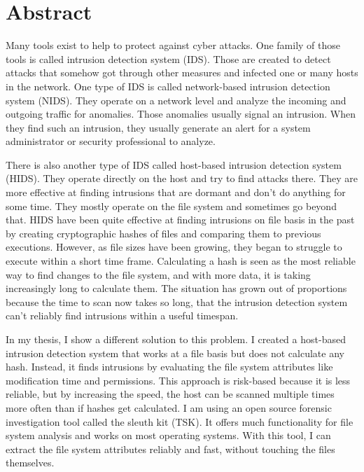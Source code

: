 \chapter*{Abstract}
\label{chap:abstract}

Many tools exist to help to protect against cyber attacks. One family of those tools is called intrusion detection system (IDS). Those are created to detect attacks that somehow got through other measures and infected one or many hosts in the network. One type of IDS is called network-based intrusion detection system (NIDS). They operate on a network level and analyze the incoming and outgoing traffic for anomalies. Those anomalies usually signal an intrusion. When they find such an intrusion, they usually generate an alert for a system administrator or security professional to analyze.

There is also another type of IDS called host-based intrusion detection system (HIDS). They operate directly on the host and try to find attacks there. They are more effective at finding intrusions that are dormant and don't do anything for some time. They mostly operate on the file system and sometimes go beyond that. HIDS have been quite effective at finding intrusions on file basis in the past by creating cryptographic hashes of files and comparing them to previous executions. However, as file sizes have been growing, they began to struggle to execute within a short time frame. Calculating a hash is seen as the most reliable way to find changes to the file system, and with more data, it is taking increasingly long to calculate them. The situation has grown out of proportions because the time to scan now takes so long, that the intrusion detection system can't reliably find intrusions within a useful timespan.

In my thesis, I show a different solution to this problem. I created a host-based intrusion detection system that works at a file basis but does not calculate any hash. Instead, it finds intrusions by evaluating the file system attributes like modification time and permissions. This approach is risk-based because it is less reliable, but by increasing the speed, the host can be scanned multiple times more often than if hashes get calculated. I am using an open source forensic investigation tool called the sleuth kit (TSK). It offers much functionality for file system analysis and works on most operating systems. With this tool, I can extract the file system attributes reliably and fast, without touching the files themselves.

